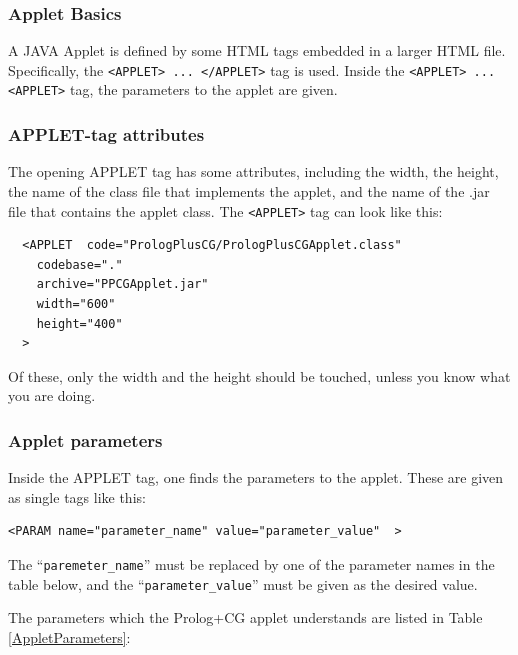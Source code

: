 \documentclass{book}
\begin{document}
\subsubsection{Applet Basics}

A JAVA Applet is defined by some HTML tags embedded in a larger HTML
file.  Specifically, the \texttt{<APPLET> ... </APPLET>} tag is
used. Inside the \texttt{<APPLET> ... <APPLET>} tag, the parameters to
the applet are given.

\subsubsection{APPLET-tag attributes}

The opening APPLET tag has some attributes, including the width, the
height, the name of the class file that implements the applet, and the
name of the .jar file that contains the applet class.  The
\texttt{<APPLET>} tag can look like this:


\begin{verbatim}
  <APPLET  code="PrologPlusCG/PrologPlusCGApplet.class"
    codebase="."
    archive="PPCGApplet.jar"
    width="600"
    height="400"
  >
\end{verbatim}


Of these, only the width and the height should be touched, unless you
know what you are doing.

\subsubsection{Applet parameters}

Inside the APPLET tag, one finds the parameters to the applet.  These
are given as single tags like this:


\begin{verbatim}
<PARAM name="parameter_name" value="parameter_value"  >
\end{verbatim}


The ``\texttt{paremeter\_name}'' must be replaced by one of the
parameter names in the table below, and the
``\texttt{parameter\_value}'' must be given as the desired value.

The parameters which the Prolog+CG applet understands are listed in Table \ref{AppletParameters}:
\end{document}
